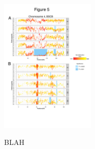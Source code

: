 \begin{figure}[tb]   
  \begin{center}
   \vspace{-0mm}
   \includegraphics[width=0.4\textwidth]{fig5}
   \renewcommand{\baselinestretch}{0.9}
   \vspace{-3mm}
   \caption{BLAH} 
\vspace{-6mm}
    \label{fig:genphys2}
  \end{center}
\end{figure}
